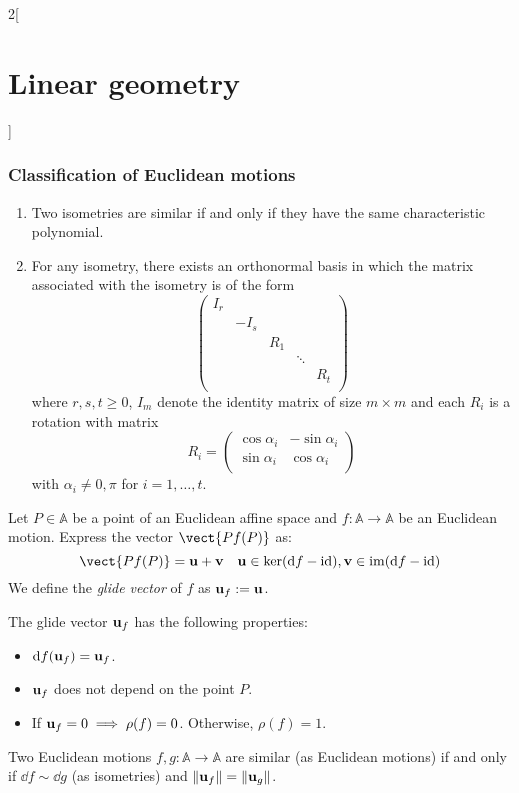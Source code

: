 \documentclass[../../../main_math.tex]{subfiles}
\begin{document}
\begin{multicols}{2}[\section{Linear geometry}]
  \subsubsection{Classification of Euclidean motions}
  \begin{theorem}
    \hfill
    \begin{enumerate}
      \item Two isometries are similar if and only if they have the same characteristic polynomial.
      \item For any isometry, there exists an orthonormal basis in which the matrix associated with the isometry is of the form  $$\begin{pmatrix}
                I_r &      &     &        &     \\
                    & -I_s &     &        &     \\
                    &      & R_1 &        &     \\
                    &      &     & \ddots &     \\
                    &      &     &        & R_t \\
              \end{pmatrix}$$ where $r,s,t\geq 0$, $I_m$ denote the identity matrix of size $m\times m$ and each $R_i$ is a rotation with matrix $$R_i=\begin{pmatrix}
                \cos\alpha_i & -\sin\alpha_i \\
                \sin\alpha_i & \cos\alpha_i  \\
              \end{pmatrix}$$ with $\alpha_i\ne0,\pi$ for $i=1,\ldots,t$.
    \end{enumerate}
  \end{theorem}
  \begin{definition}
    Let $P\in\mathbb{A}$ be a point of an Euclidean affine space and $f:\mathbb{A}\rightarrow\mathbb{A}$ be an Euclidean motion. Express the vector $\vect{Pf(P)}$ as: $$\vect{Pf(P)}=\vf{u}+\vf{v}\quad\vf{u}\in\ker(\dd{f}-\id),\vf{v}\in\im(\dd{f}-\id)$$ We define the \emph{glide vector} of $f$ as $\boldsymbol{\mathrm{u}}_f:=\boldsymbol{\mathrm{u}}$.
  \end{definition}
  \begin{proposition}
    The glide vector $\boldsymbol{\mathrm{u}}_f$ has the following properties:
    \begin{itemize}
      \item $\dd{f(\boldsymbol{\mathrm{u}}_f)}=\boldsymbol{\mathrm{u}}_f$.
      \item $\boldsymbol{\mathrm{u}}_f$ does not depend on the point $P$.
      \item If $\boldsymbol{\mathrm{u}}_f=0\implies\rho(f)=0$. Otherwise, $\rho(f)=1$.
    \end{itemize}
  \end{proposition}
  \begin{theorem}
    Two Euclidean motions $f,g:\mathbb{A}\rightarrow\mathbb{A}$ are similar (as Euclidean motions) if and only if $\dd{f}\sim \dd{g}$ (as isometries) and $\|\boldsymbol{\mathrm{u}}_f\|=\|\boldsymbol{\mathrm{u}}_g\|$.
  \end{theorem}

\end{multicols}
\end{document}
